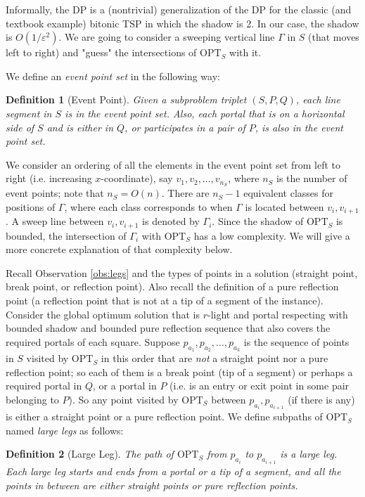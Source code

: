 \documentclass[pdflatex,sn-mathphys-num]{sn-jnl}
\theoremstyle{thmstyleone}
\newtheorem{definition}{Definition} %
\newcommand{\eps}{\varepsilon}
\newcommand{\OPT}{{\text{OPT}}}
\begin{document}
Informally, the DP is a (nontrivial) generalization of the DP for the classic (and textbook example) bitonic TSP in which the shadow is 2. In our case, the shadow is $O(1/\eps^2)$.
We are going to consider a sweeping vertical line $\Gamma$ in $S$ (that moves left to right) and "guess" the intersections of $\OPT_S$ with it. 

We define an {\em event point set} in the following way:
\begin{definition}[Event Point]
	Given a subproblem triplet $ (S, P, Q) $, each line segment in $S$ is in the event point set. Also, each portal that is on a horizontal side of $S$
	and is either in $Q$, or participates in a pair of $P$, is also in the event point set.
\end{definition}
We consider an ordering of all the elements in the event point set from left to right (i.e. increasing $x$-coordinate), say $v_1,v_2,\ldots,v_{n_S}$, where $n_S$ is the number of event points; note that $n_S=O(n)$.
There are $n_S - 1$ equivalent classes for positions of $\Gamma$, where each class corresponds to when $\Gamma$ is located between $v_i,v_{i+1}$. A sweep line between $v_i,v_{i+1}$ is denoted by $\Gamma_i$.
Since the shadow of $\OPT_S$ is bounded, the intersection of $\Gamma_i$ with $\OPT_S$ has a low complexity. We will give a more concrete explanation of that complexity below.

Recall Observation \ref{obs:legs} and the types of points in a solution (straight point, break point, or reflection point). Also recall the definition of a pure reflection point (a reflection point that  is not
at a tip of a segment of the instance). Consider the global optimum solution that is $r$-light and portal respecting with bounded shadow
and bounded pure reflection sequence that also covers the required portals of each square.
Suppose $p_{a_1},p_{a_2},\ldots,p_{a_k}$ is the sequence of points in $S$ visited by $\OPT_S$ in this order that are 
{\em not} a straight point nor a pure reflection point; so each of them is a break point (tip of a segment) or perhaps a required portal in $Q$, or a portal in $ P $ (i.e. is an entry or exit point in some pair belonging to $ P $).
So any point visited by $\OPT_S$ between $p_{a_i},p_{a_{i+1}}$ (if there is any) is either a straight point
or a pure reflection point. We define subpaths of $ \OPT_S $ named {\em large legs} as follows:

\begin{definition}[Large Leg]
	The path of $ \OPT_S $ from $p_{a_i}$ to $p_{a_{i+1}}$ is a large leg. Each large leg starts and ends from a portal or a tip of a segment, and all the points in between are either straight points or pure reflection points.
\end{definition}
\end{document}
